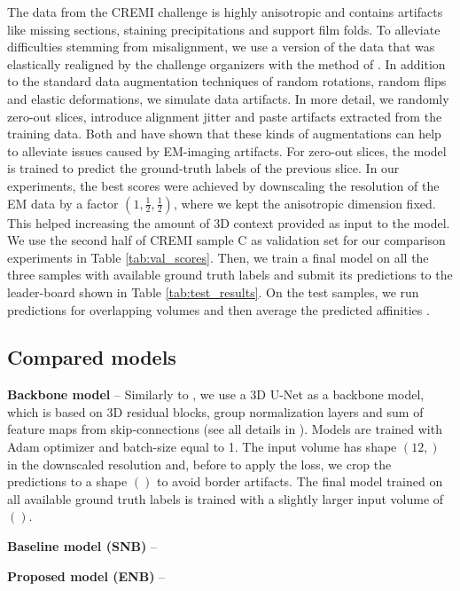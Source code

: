 The data from the CREMI challenge is highly anisotropic and contains artifacts like missing sections, staining precipitations and support film folds. 
To alleviate difficulties stemming from misalignment, we use a version of the data that was elastically realigned by the challenge organizers with the method of \cite{saalfeld2012elastic}.
In addition to the standard data augmentation techniques of random rotations, random flips and  elastic deformations, we simulate data artifacts.
In more detail, we randomly zero-out slices, introduce alignment jitter and paste artifacts extracted from the training data. Both \cite{funke2018large} and \cite{lee2017superhuman} have shown
that these kinds of augmentations can help to alleviate issues caused by EM-imaging artifacts. For zero-out slices, the model is trained to predict the ground-truth labels of the previous slice.
In our experiments, the best scores were achieved by downscaling the resolution of the EM data by a factor $(1,\frac{1}{2},\frac{1}{2})$, where we kept the anisotropic dimension fixed. This helped increasing the amount of 3D context provided as input to the model.
We use the second half of CREMI sample C as validation set for our comparison experiments in Table \ref{tab:val_scores}. Then, we train a final model on all the three samples with available ground truth labels and submit its predictions to the leader-board shown in Table \ref{tab:test_results}. 
On the test samples, we run predictions for overlapping volumes and then average the predicted affinities . 


\subsection{Compared models}
\textbf{Backbone model} -- Similarly to \cite{lee2019learning,lee2017superhuman,wolf2018mutex}, we use a 3D U-Net \cite{ronneberger2015u,cciccek20163d} as a backbone model, which is based on 3D residual blocks, group normalization layers and sum of feature maps from skip-connections (see all details in ). 
Models are trained with Adam optimizer and batch-size equal to 1. The input volume has shape $(12,)$ in the downscaled resolution and, before to apply the loss, we crop the predictions to a shape $()$ to avoid border artifacts. 
The final model trained on all available ground truth labels is trained with a slightly larger input volume of $()$. 
 
\textbf{Baseline model (SNB)} -- 


\textbf{Proposed model (ENB)} -- 

